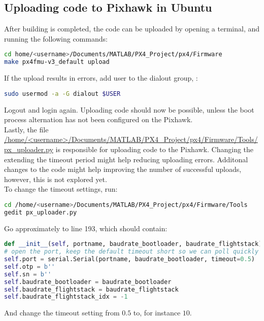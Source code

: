 \subsection{Uploading code to Pixhawk in Ubuntu}
After building is completed, the code can be uploaded by opening a terminal, and running the following commands:
\begin{lstlisting}[language=sh]
cd home/<username>/Documents/MATLAB/PX4_Project/px4/Firmware
make px4fmu-v3_default upload
\end{lstlisting}
If the upload results in errors, add user to the dialout group, \cite{Dialout}:
\begin{lstlisting}[language=sh]
sudo usermod -a -G dialout $USER
\end{lstlisting}
Logout and login again. Uploading code should now be possible, unless the boot process alternation has not been configured on the Pixhawk.\\
\newline
Lastly, the file \url{/home/<username>/Documents/MATLAB/PX4_Project/px4/Firmware/Tools/px_uploader.py} is responsible for uploading code to the Pixhawk. Changing the extending the timeout period might help reducing uploading errors. Additonal changes to the code might help improving the number of successful uploads, however, this is not explored yet.\\
\newline
To change the timeout settings, run:
\begin{lstlisting}[language=sh]
cd /home/<username>/Documents/MATLAB/PX4_Project/px4/Firmware/Tools
gedit px_uploader.py
\end{lstlisting}
Go approximately to line 193, which should contain:
\begin{lstlisting}[language=Python]
    def __init__(self, portname, baudrate_bootloader, baudrate_flightstack):
# open the port, keep the default timeout short so we can poll quickly
self.port = serial.Serial(portname, baudrate_bootloader, timeout=0.5)
self.otp = b''
self.sn = b''
self.baudrate_bootloader = baudrate_bootloader
self.baudrate_flightstack = baudrate_flightstack
self.baudrate_flightstack_idx = -1
\end{lstlisting}
And change the timeout setting from $0.5$ to, for instance $10$.
